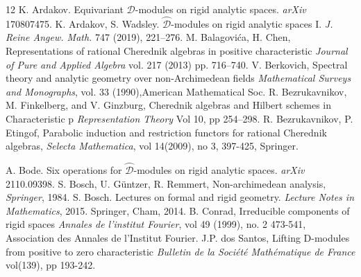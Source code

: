 \documentclass{amsart}
\newcommand{\D}{\mathcal{D}}
\begin{document}
\begin{thebibliography}{12}
 K. Ardakov. Equivariant $\D$-modules on rigid analytic spaces. \emph{arXiv} 170807475.
 K. Ardakov, S. Wadsley. $\wideparen{\D}$-modules on rigid analytic spaces I. \emph{J. Reine Angew. Math.} 747 (2019), 221--276.
 M. Balagovića, H. Chen, Representations of rational Cherednik algebras in positive characteristic \emph{Journal of Pure and Applied Algebra}
vol. 217 (2013) pp. 716–740.
 V. Berkovich, Spectral theory and analytic geometry over non-Archimedean fields \emph{Mathematical Surveys and Monographs}, vol. 33 (1990),American Mathematical Soc.
 R. Bezrukavnikov, M. Finkelberg, and V. Ginzburg, Cherednik algebras and Hilbert schemes in Characteristic p \emph{Representation Theory} Vol 10, pp 254–298.
 R. Bezrukavnikov, P. Etingof, Parabolic induction and restriction functors for rational Cherednik algebras, \emph{Selecta Mathematica}, vol 14(2009), no 3, 397-425, Springer.

 A. Bode. Six operations for $\wideparen{\D}$-modules on rigid analytic spaces. \emph{arXiv} 2110.09398.
 S. Bosch, U. Güntzer, R. Remmert, Non-archimedean analysis, \emph{ Springer}, 1984.
 S. Bosch. Lectures on formal and rigid geometry. \emph{Lecture Notes in Mathematics}, 2015. Springer, Cham, 2014.
 B. Conrad, Irreducible components of rigid spaces \emph{Annales de l'institut Fourier}, vol 49 (1999), no. 2 473-541, Association des Annales de l'Institut Fourier.
 J.P. dos Santos,  Lifting D-modules from positive to zero characteristic
\emph{Bulletin de la Société Mathématique de France} vol(139), pp 193-242.


\end{thebibliography}
\end{document}
